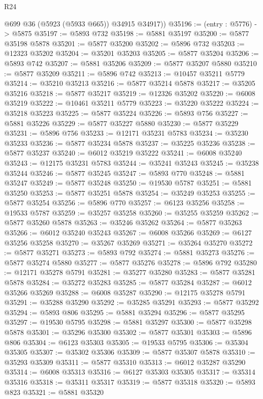 \begin{lexlean}{R24}
\begin{coremodule}
        @699
        @36
        (@5923 (@5933 @665))
        @34915
        @34917))
@35196 := (entry : @5776) -> @5875
@35197 := @5893 @732
@35198 := @5881 @35197
@35200 := @5877 @35198 @5878
@35201 := @5877 @35200
@35202 := @5896 @732
@35203 := @12323 @35202
@35204 := @35201 @35203
@35205 := @5877 @35204
@35206 := @5893 @742
@35207 := @5881 @35206
@35209 := @5877 @35207 @5880
@35210 := @5877 @35209
@35211 := @5896 @742
@35213 := @10457 @35211 @5779
@35214 := @35210 @35213
@35216 := @5877 @35214 @5878
@35217 := @35205 @35216
@35218 := @5877 @35217
@35219 := @12326 @35202
@35220 := @6008 @35219
@35222 := @10461 @35211 @5779
@35223 := @35220 @35222
@35224 := @35218 @35223
@35225 := @5877 @35224
@35226 := @5893 @756
@35227 := @5881 @35226
@35229 := @5877 @35227 @5880
@35230 := @5877 @35229
@35231 := @5896 @756
@35233 := @12171 @35231 @5783
@35234 := @35230 @35233
@35236 := @5877 @35234 @5878
@35237 := @35225 @35236
@35238 := @5877 @35237
@35240 := @6012 @35219 @35222
@35241 := @6008 @35240
@35243 := @12175 @35231 @5783
@35244 := @35241 @35243
@35245 := @35238 @35244
@35246 := @5877 @35245
@35247 := @5893 @770
@35248 := @5881 @35247
@35249 := @5877 @35248
@35250 := @19530 @5787
@35251 := @5881 @35250
@35253 := @5877 @35251 @5878
@35254 := @35249 @35253
@35255 := @5877 @35254
@35256 := @5896 @770
@35257 := @6123 @35256
@35258 := @19533 @5787
@35259 := @35257 @35258
@35260 := @35255 @35259
@35262 := @5877 @35260 @5878
@35263 := @35246 @35262
@35264 := @5877 @35263
@35266 := @6012 @35240 @35243
@35267 := @6008 @35266
@35269 := @6127 @35256 @35258
@35270 := @35267 @35269
@35271 := @35264 @35270
@35272 := @5877 @35271
@35273 := @5893 @792
@35274 := @5881 @35273
@35276 := @5877 @35274 @5880
@35277 := @5877 @35276
@35278 := @5896 @792
@35280 := @12171 @35278 @5791
@35281 := @35277 @35280
@35283 := @5877 @35281 @5878
@35284 := @35272 @35283
@35285 := @5877 @35284
@35287 := @6012 @35266 @35269
@35288 := @6008 @35287
@35290 := @12175 @35278 @5791
@35291 := @35288 @35290
@35292 := @35285 @35291
@35293 := @5877 @35292
@35294 := @5893 @806
@35295 := @5881 @35294
@35296 := @5877 @35295
@35297 := @19530 @5795
@35298 := @5881 @35297
@35300 := @5877 @35298 @5878
@35301 := @35296 @35300
@35302 := @5877 @35301
@35303 := @5896 @806
@35304 := @6123 @35303
@35305 := @19533 @5795
@35306 := @35304 @35305
@35307 := @35302 @35306
@35309 := @5877 @35307 @5878
@35310 := @35293 @35309
@35311 := @5877 @35310
@35313 := @6012 @35287 @35290
@35314 := @6008 @35313
@35316 := @6127 @35303 @35305
@35317 := @35314 @35316
@35318 := @35311 @35317
@35319 := @5877 @35318
@35320 := @5893 @823
@35321 := @5881 @35320

\end{coremodule}
\end{lexlean}
